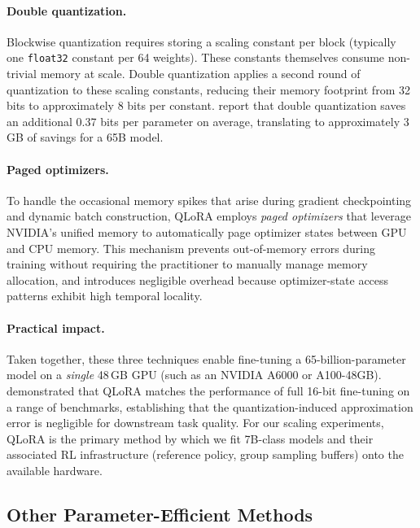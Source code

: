 \paragraph{Double quantization.}
Blockwise quantization requires storing a scaling constant per block
(typically one \texttt{float32} constant per 64 weights).  These
constants themselves consume non-trivial memory at scale.  Double
quantization applies a second round of quantization to these scaling
constants, reducing their memory footprint from 32 bits to approximately
8 bits per constant.  \citet{dettmers2023qlora} report that double
quantization saves an additional 0.37 bits per parameter on average,
translating to approximately 3\,GB of savings for a 65B model.

\paragraph{Paged optimizers.}
To handle the occasional memory spikes that arise during gradient
checkpointing and dynamic batch construction, QLoRA employs
\emph{paged optimizers} that leverage NVIDIA's unified memory to
automatically page optimizer states between GPU and CPU memory.  This
mechanism prevents out-of-memory errors during training without
requiring the practitioner to manually manage memory allocation, and
introduces negligible overhead because optimizer-state access patterns
exhibit high temporal locality.

\paragraph{Practical impact.}
Taken together, these three techniques enable fine-tuning a
65-billion-parameter model on a \emph{single} 48\,GB GPU (such as an
NVIDIA A6000 or A100-48GB).  \citet{dettmers2023qlora} demonstrated that
QLoRA matches the performance of full 16-bit fine-tuning on a range of
benchmarks, establishing that the quantization-induced approximation
error is negligible for downstream task quality.  For our scaling
experiments, QLoRA is the primary method by which we fit 7B-class models
and their associated RL infrastructure (reference policy, group sampling
buffers) onto the available hardware.

\subsection{Other Parameter-Efficient Methods}
\label{sec:other-peft}

